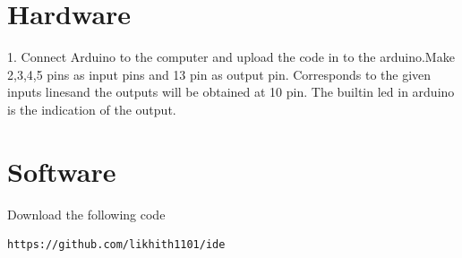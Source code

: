 \documentclass[10pt, a4paper]{article}
\begin{document}
\section{Hardware}
1. Connect Arduino to the computer and upload the code in to the arduino.Make 2,3,4,5 pins as input pins and 13 pin as output pin. Corresponds to the given inputs linesand  the outputs will be obtained at 10 pin. The builtin led in arduino is the indication of the output.
\section{Software}
 Download the following code
 \begin{lstlisting}
https://github.com/likhith1101/ide
 \end{lstlisting}
\end{document}
